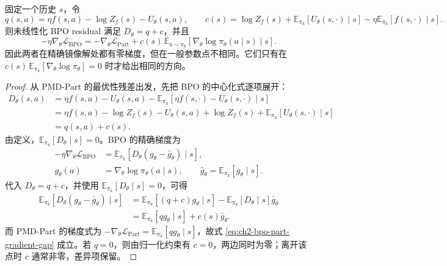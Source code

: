 \begin{proposition}
\label{prop:ch2-bpo-part-gradient-gap}
固定一个历史 $s$，令
\begin{equation}
\label{eq:ch2-bpo-part-qc}
q(s,a)=\eta f(s,a)-\log Z_f(s)-U_\theta(s,a),
\qquad
c(s)=\log Z_f(s)+\mathbb E_{\pi_k}[U_\theta(s,\cdot)\mid s]-\eta\mathbb E_{\pi_k}[f(s,\cdot)\mid s].
\end{equation}
则未线性化 BPO residual 满足 $D_\theta=q+c$，并且
\begin{equation}
\label{eq:ch2-bpo-part-gradient-gap}
-\eta\nabla_\theta\mathcal L_{\mathrm{BPO}}
=-\nabla_\theta\mathcal L_{\mathrm{Part}}
+c(s)\,\mathbb E_{a\sim\pi_k}[\nabla_\theta\log\pi_\theta(a\mid s)\mid s].
\end{equation}
因此两者在精确镜像解处都有零梯度，但在一般参数点不相同。它们只有在
$c(s)\,\mathbb E_{\pi_k}[\nabla_\theta\log\pi_\theta]=0$
时才给出相同的方向。
\end{proposition}

\begin{proof}
从 PMD-Part 的最优性残差出发，先把 BPO 的中心化式逐项展开：
\begin{align*}
D_\theta(s,a)
&=\eta f(s,a)-U_\theta(s,a)
 -\mathbb E_{\pi_k}[\eta f(s,\cdot)-U_\theta(s,\cdot)\mid s]\\
&=\eta f(s,a)-\log Z_f(s)-U_\theta(s,a)
 +\log Z_f(s)+\mathbb E_{\pi_k}[U_\theta(s,\cdot)\mid s]\\
&=q(s,a)+c(s).
\end{align*}
由定义，$\mathbb E_{\pi_k}[D_\theta\mid s]=0$。BPO 的精确梯度为
\begin{align*}
-\eta\nabla_\theta\mathcal L_{\mathrm{BPO}}
&=\mathbb E_{\pi_k}\left[D_\theta
 \left(g_\theta-\bar g_\theta\right)\mid s\right],\\
 g_\theta(a)&=\nabla_\theta\log\pi_\theta(a\mid s),
 \qquad \bar g_\theta=\mathbb E_{\pi_k}[g_\theta\mid s].
\end{align*}
代入 $D_\theta=q+c$，并使用 $\mathbb E_{\pi_k}[D_\theta\mid s]=0$，可得
\begin{align*}
\mathbb E_{\pi_k}[D_\theta(g_\theta-\bar g_\theta)\mid s]
&=\mathbb E_{\pi_k}[(q+c)g_\theta\mid s]
 -\mathbb E_{\pi_k}[D_\theta\mid s]\bar g_\theta\\
&=\mathbb E_{\pi_k}[qg_\theta\mid s]+c(s)\bar g_\theta.
\end{align*}
而 PMD-Part 的梯度式为
$-\nabla_\theta\mathcal L_{\mathrm{Part}}=\mathbb E_{\pi_k}[qg_\theta\mid s]$，故式
\eqref{eq:ch2-bpo-part-gradient-gap}
成立。若 $q=0$，则由归一化约束有 $c=0$，两边同时为零；离开该点时 $c$ 通常非零，差异项保留。
\end{proof}

